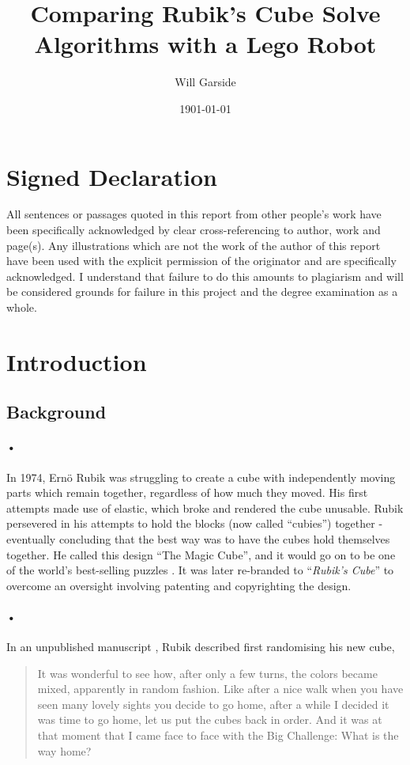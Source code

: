 \documentclass{article}
\title{Comparing Rubik's Cube Solve Algorithms with a Lego Robot}
\date{1901-01-01}
\author{Will Garside}
\begin{document}
\maketitle
\newpage
{}

\section{Signed Declaration}
All sentences or passages quoted in this report from other people's work have been specifically acknowledged by clear cross-referencing to author, work and page(s). Any illustrations which are not the work of the author of this report have been used with the explicit permission of the originator and are specifically acknowledged. I understand that failure to do this amounts to plagiarism and will be considered grounds for failure in this project and the degree examination as a whole.
\tableofcontents
\newpage
{}

\section{Introduction}
\subsection{Background}
\paragraph{•}
In 1974, Ern\"{o} Rubik was struggling to create a cube with independently moving parts which remain together, regardless of how much they moved. His first attempts made use of elastic, which broke and rendered the cube unusable. Rubik persevered in his attempts to hold the blocks (now called \enquote{cubies}) together - eventually concluding that the best way was to have the cubes hold themselves together. He called this design \enquote{The Magic Cube}, and it would go on to be one of the world's best-selling puzzles \cite{Waxman2014b}. It was later re-branded to \enquote{\textit{Rubik's Cube}} to overcome an oversight involving patenting and copyrighting  the design.
\paragraph{•}
In an unpublished manuscript \cite{Rubik1986}, Rubik described first randomising his new cube, \blockquote{It was wonderful to see how, after only a few turns, the colors became mixed, apparently in random fashion. Like after a nice walk when you have seen many lovely sights you decide to go home, after a while I decided it was time to go home, let us put the cubes back in order. And it was at that moment that I came face to face with the Big Challenge: What is the way home?} 
\end{document}
